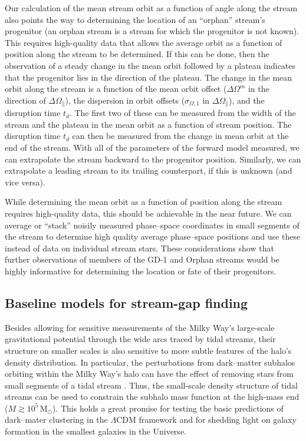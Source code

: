 \documentclass{emulateapj}
\newcommand{\msun}{\ensuremath{\,\mathrm{M}_{\odot}}}
\newcommand{\opar}{\ensuremath{\Omega_\parallel}}
\begin{document}
Our calculation of the mean stream orbit as a function of angle along
the stream also points the way to determining the location of an
``orphan'' stream's progenitor (an orphan stream is a stream for which
the progenitor is not known). This requires high-quality data that
allows the average orbit as a function of position along the stream to
be determined. If this can be done, then the observation of a steady
change in the mean orbit followed by a plateau indicates that the
progenitor lies in the direction of the plateau. The change in the
mean orbit along the stream is a function of the mean orbit offset
($\Delta \Omega^m$ in the direction of $\Delta \opar$), the dispersion
in orbit offsets ($\sigma_{\Omega,1}$ in $\Delta \opar$), and the
disruption time $t_d$. The first two of these can be measured from the
width of the stream and the plateau in the mean orbit as a function of
stream position. The disruption time $t_d$ can then be measured from
the change in mean orbit at the end of the stream. With all of the
parameters of the forward model measured, we can extrapolate the
stream backward to the progenitor position. Similarly, we can
extrapolate a leading stream to its trailing counterpart, if this is
unknown (and vice versa).

While determining the mean orbit as a function of position along the
stream requires high-quality data, this should be achievable in the
near future. We can average or ``stack'' noisily measured phase--space
coordinates in small segments of the stream to determine high quality
average phase--space positions and use these instead of data on
individual stream stars. These considerations show that further
observations of members of the GD-1 and Orphan streams would be highly
informative for determining the location or fate of their progenitors.

\subsection{Baseline models for stream-gap finding}

Besides allowing for sensitive measurements of the Milky Way's
large-scale gravitational potential through the wide arcs traced by
tidal streams, their structure on smaller scales is also sensitive to
more subtle features of the halo's density distribution. In
particular, the perturbations from dark--matter subhalos orbiting
within the Milky Way's halo can have the effect of removing stars from
small segments of a tidal stream \citep{Yoon11a,Carlberg12a}. Thus,
the small-scale density structure of tidal streams can be used to
constrain the subhalo mass function at the high-mass end ($M \gtrsim
10^5\msun$). This holds a great promise for testing the basic
predictions of dark--mater clustering in the $\Lambda$CDM framework
and for shedding light on galaxy formation in the smallest galaxies in
the Universe.
\end{document}
